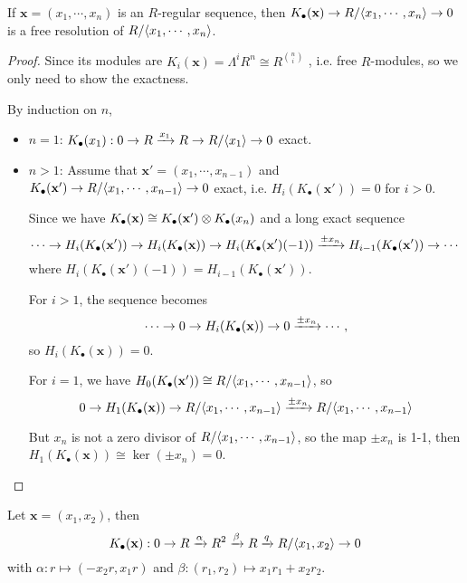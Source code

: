 \begin{theorem}
  If $\mathbf{x} = (x_1, \cdots, x_n)$ is an $R$-regular sequence, then
  $K_\bullet(\mathbf{x}) \to R/\langle x_1, \cdots, x_n\rangle \to 0$ is a free resolution of 
  $R / \langle x_1, \cdots, x_n\rangle$.

  \begin{proof}
    Since its modules are
    $K_i(\mathbf{x}) = \Lambda^i R^n \cong R^{n \choose i}$
    , i.e. free $R$-modules, so we only need to show the exactness.

    By induction on $n$, 
    \begin{itemize}
      \item $n = 1$:  
        $K_\bullet(x_1) : 0 \to R \xrightarrow{x_1} R \to R/\langle x_1\rangle \to 0$ exact.

      \item $n > 1$:  
        Assume that $\mathbf{x}' = (x_1, \cdots, x_{n-1})$ and 
        $K_\bullet(\mathbf{x}') \to R/\langle x_1, \cdots, x_{n-1}\rangle \to 0$ exact, 
        i.e. $H_i(K_\bullet(\mathbf{x}')) = 0$ for $i > 0$.

        Since we have $K_\bullet(\mathbf{x}) \cong K_\bullet(\mathbf{x}') \otimes 
        K_\bullet(x_n)$ and a long exact sequence
        $$
        \cdots \to H_i(K_\bullet(\mathbf{x}')) \to H_i(K_\bullet(\mathbf{x})) \to 
        H_i(K_\bullet(\mathbf{x}')(-1)) \xrightarrow{\pm x_n} H_{i-1}(K_\bullet(\mathbf{x}')) \to \cdots
        $$
        where $H_i(K_\bullet(\mathbf{x}')(-1)) = H_{i-1}(K_\bullet(\mathbf{x}'))$.

        For $i > 1$, the sequence becomes
        $$
        \cdots \to 0 \to H_i(K_\bullet(\mathbf{x})) \to 0 \xrightarrow{\pm x_n} \cdots,
        $$
        so $H_i(K_\bullet(\mathbf{x})) = 0$. 

        For $i = 1$, we have $H_0(K_\bullet(\mathbf{x}')) \cong R/\langle x_1, \cdots, x_{n-1}\rangle$, so
        $$
        0 \to H_1(K_\bullet(\mathbf{x})) \to R/\langle x_1, \cdots, x_{n-1}\rangle \xrightarrow{\pm x_n} 
        R/\langle x_1, \cdots, x_{n-1}\rangle
        $$

        But $x_n$ is not a zero divisor of $R/\langle x_1, \cdots, x_{n-1}\rangle$, so the map
        $\pm x_n$ is 1-1, then $H_1(K_\bullet(\mathbf{x})) \cong \ker (\pm x_n) = 0$. 
    \end{itemize}
  \end{proof}
\end{theorem}

\begin{example}
  Let $\mathbf{x} = (x_1, x_2)$, then
  $$
  K_\bullet(\mathbf{x}) : 0 \to R \xrightarrow{\alpha} R^2 \xrightarrow{\beta} R \xrightarrow{q} R/\langle x_1, x_2\rangle \to 0
  $$
  with $\alpha : r \mapsto (-x_2r, x_1r)$ and $\beta : (r_1, r_2) \mapsto x_1r_1 + x_2r_2$.
\end{example}

